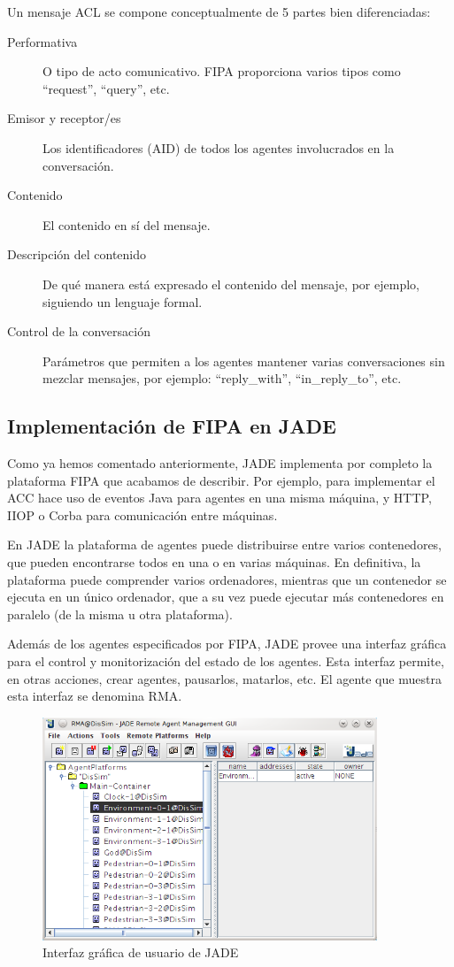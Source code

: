 Un mensaje ACL se compone conceptualmente de 5 partes bien diferenciadas:

\begin{description}
 \item[Performativa] O tipo de acto comunicativo. FIPA proporciona varios tipos
 como ``request'', ``query'', etc.
 \item[Emisor y receptor/es] Los identificadores (AID) de todos los agentes
 involucrados en la conversación.
 \item[Contenido] El contenido en sí del mensaje.
 \item[Descripción del contenido] De qué manera está expresado el contenido del
 mensaje, por ejemplo, siguiendo un lenguaje formal.
 \item[Control de la conversación] Parámetros que permiten a los agentes
 mantener varias conversaciones sin mezclar mensajes, por ejemplo:
 ``reply\_with'', ``in\_reply\_to'', etc.
\end{description}

\subsection{Implementación de FIPA en JADE}

Como ya hemos comentado anteriormente, JADE implementa por completo la
plataforma FIPA que acabamos de describir\cite{Corral06}. Por ejemplo, para
implementar el ACC hace uso de eventos Java para agentes en una misma máquina, y
HTTP, IIOP o Corba para comunicación entre máquinas.

En JADE la plataforma de agentes puede distribuirse entre varios contenedores,
que pueden encontrarse todos en una o en varias máquinas. En definitiva, la
plataforma puede comprender varios ordenadores, mientras que un contenedor se
ejecuta en un único ordenador, que a su vez puede ejecutar más contenedores en
paralelo (de la misma u otra plataforma).

Además de los agentes especificados por FIPA, JADE provee una interfaz gráfica
para el control y monitorización del estado de los agentes. Esta interfaz
permite, en otras acciones, crear agentes, pausarlos, matarlos, etc. El agente
que muestra esta interfaz se denomina RMA.

\begin{figure}[H]
 \centering
 \includegraphics[width=100mm]{figuras/cap4/rma.png}
 \caption{Interfaz gráfica de usuario de JADE}
\end{figure}

